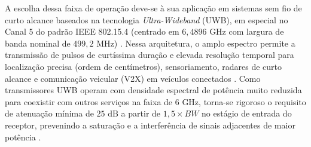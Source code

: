 A escolha dessa faixa de operação deve-se à sua aplicação em sistemas sem fio de curto alcance baseados na tecnologia \textit{Ultra-Wideband} (UWB), em especial no Canal 5 do padrão IEEE 802.15.4 (centrado em $6{,}4896\text{ GHz}$ com largura de banda nominal de $499{,}2\text{ MHz}$) \cite{ieee802154}. Nessa arquitetura, o amplo espectro permite a transmissão de pulsos de curtíssima duração e elevada resolução temporal para localização precisa (ordem de centímetros), sensoriamento, radares de curto alcance e comunicação veicular (V2X) em veículos conectados \cite{ieee802154}. Como transmissores UWB operam com densidade espectral de potência muito reduzida para coexistir com outros serviços na faixa de $6\text{ GHz}$, torna-se rigoroso o requisito de atenuação mínima de $25\text{ dB}$ a partir de $1{,}5 \times BW$ no estágio de entrada do receptor, prevenindo a saturação e a interferência de sinais adjacentes de maior potência \cite{Filter1}.